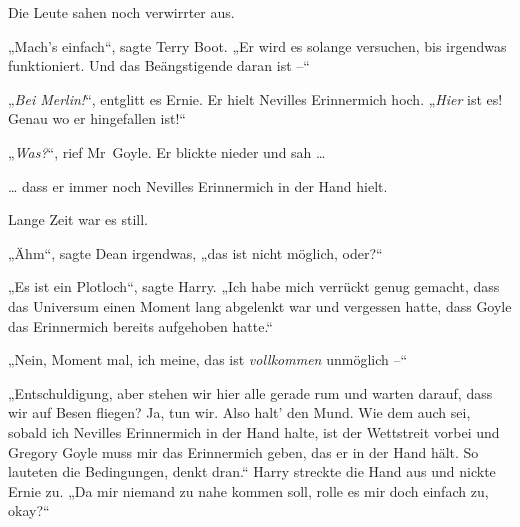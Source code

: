 Die Leute sahen noch verwirrter aus.

„Mach’s einfach“, sagte Terry Boot. „Er wird es solange versuchen, bis irgendwas funktioniert. Und das Beängstigende daran ist –“

„\emph{Bei Merlin!}“, entglitt es Ernie. Er hielt Nevilles Erinnermich hoch. „\emph{Hier} ist es! Genau wo er hingefallen ist!“

„\emph{Was?}“, rief Mr~Goyle. Er blickte nieder und sah …

… dass er immer noch Nevilles Erinnermich in der Hand hielt.

Lange Zeit war es still.

„Ähm“, sagte Dean irgendwas, „das ist nicht möglich, oder?“

„Es ist ein Plotloch“, sagte Harry. „Ich habe mich verrückt genug gemacht, dass das Universum einen Moment lang abgelenkt war und vergessen hatte, dass Goyle das Erinnermich bereits aufgehoben hatte.“

„Nein, Moment mal, ich meine, das ist \emph{vollkommen} unmöglich –“

„Entschuldigung, aber stehen wir hier alle gerade rum und warten darauf, dass wir auf Besen fliegen? Ja, tun wir. Also halt’ den Mund. Wie dem auch sei, sobald ich Nevilles Erinnermich in der Hand halte, ist der Wettstreit vorbei und Gregory Goyle muss mir das Erinnermich geben, das er in der Hand hält. So lauteten die Bedingungen, denkt dran.“ Harry streckte die Hand aus und nickte Ernie zu. „Da mir niemand zu nahe kommen soll, rolle es mir doch einfach zu, okay?“

